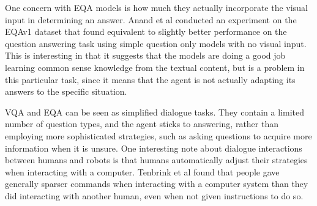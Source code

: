 \documentclass{article}
\begin{document}
One concern with EQA models is how much they actually incorporate the visual input in determining an answer. Anand et al conducted an experiment on the EQAv1 dataset that found equivalent to slightly better performance on the question answering task using simple question only models with no visual input\cite{blindfolded}. This is interesting in that it suggests that the models are doing a good job learning common sense knowledge from the textual content, but is a problem in this particular task, since it means that the agent is not actually adapting its answers to the specific situation. 




VQA and EQA can be seen as simplified dialogue tasks. They contain a limited number of question types, and the agent sticks to answering, rather than employing more sophisticated strategies, such as asking questions to acquire more information when it is unsure. One interesting note about dialogue interactions between humans and robots is that humans automatically adjust their strategies when interacting with a computer. Tenbrink et al found that people gave generally sparser commands when interacting with a computer system than they did interacting with another human, even when not given instructions to do so\cite{Tenbrink:2010qf}. 
\end{document}
